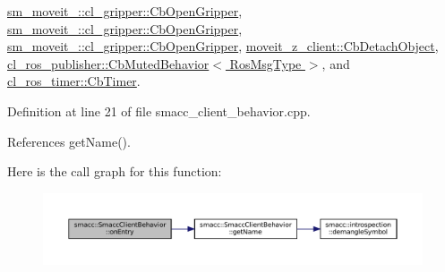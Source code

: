 \hyperlink{classsm__moveit__2_1_1cl__gripper_1_1CbOpenGripper_aaa18f60580c10e891b572f61f85ffb05}{sm\+\_\+moveit\+\_\+::cl\+\_\+gripper\+::\+Cb\+Open\+Gripper}, \hyperlink{classsm__moveit__3_1_1cl__gripper_1_1CbOpenGripper_abed7a0ca4de88c6b0e02e7271cb552f3}{sm\+\_\+moveit\+\_\+::cl\+\_\+gripper\+::\+Cb\+Open\+Gripper}, \hyperlink{classsm__moveit__4_1_1cl__gripper_1_1CbOpenGripper_a246d23aea688d231e7f5197746608afc}{sm\+\_\+moveit\+\_\+::cl\+\_\+gripper\+::\+Cb\+Open\+Gripper}, \hyperlink{classmoveit__z__client_1_1CbDetachObject_a2c071ca5d2e82ef8c57d3cf2082897a2}{moveit\+\_\+z\+\_\+client\+::\+Cb\+Detach\+Object}, \hyperlink{classcl__ros__publisher_1_1CbMutedBehavior_a79376d9160e3bd44678a2c0d89f1b4de}{cl\+\_\+ros\+\_\+publisher\+::\+Cb\+Muted\+Behavior$<$ Ros\+Msg\+Type $>$}, and \hyperlink{classcl__ros__timer_1_1CbTimer_aceba45e86271cf1b7333e2f42c246a38}{cl\+\_\+ros\+\_\+timer\+::\+Cb\+Timer}.



Definition at line 21 of file smacc\+\_\+client\+\_\+behavior.\+cpp.



References get\+Name().


Here is the call graph for this function\+:
\nopagebreak
\begin{figure}[H]
\begin{center}
\leavevmode
\includegraphics[width=350pt]{classsmacc_1_1SmaccClientBehavior_a7962382f93987c720ad432fef55b123f_cgraph}
\end{center}
\end{figure}
\mbox{\label{classsmacc_1_1SmaccClientBehavior_ac0cd72d42bd00425362a97c9803ecce5}} 
